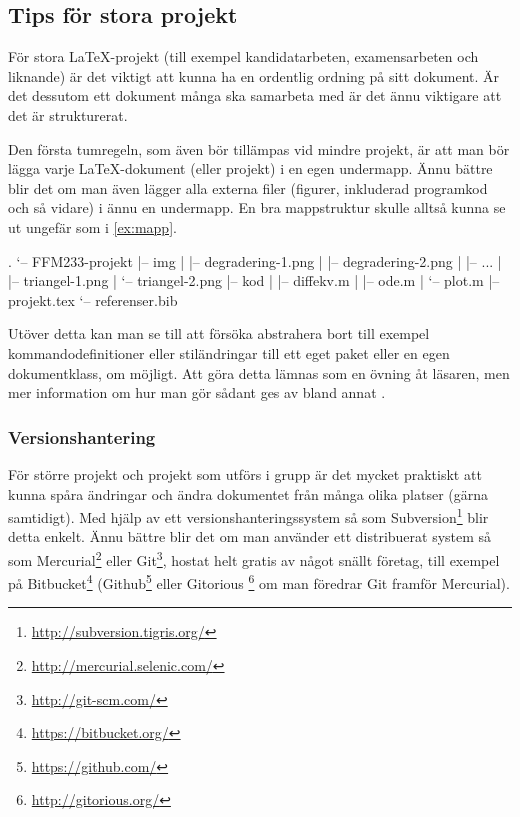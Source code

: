 \documentclass[lang=sv,ptsize=10pt,font=none,nomath,titles=bf,../../a4.tex]{subfiles}
\begin{document}
\subsection{Tips för stora projekt}
För stora \LaTeX-projekt (till exempel kandidatarbeten, examensarbeten
och liknande) är det viktigt att kunna ha en ordentlig ordning på sitt
dokument. Är det dessutom ett dokument många ska samarbeta med är det
ännu viktigare att det är strukturerat.

Den första tumregeln, som även bör tillämpas vid mindre projekt, är att
man bör lägga varje \LaTeX-dokument (eller projekt) i en egen undermapp.
Ännu bättre blir det om man även lägger alla externa filer (figurer,
inkluderad programkod och så vidare) i ännu en undermapp. En bra
mappstruktur skulle alltså kunna se ut ungefär som i \cref{ex:mapp}.

\begin{kod}
	\begin{textcode}
.
`-- FFM233-projekt
|-- img
|   |-- degradering-1.png
|   |-- degradering-2.png
|   |-- ...
|   |-- triangel-1.png
|   `-- triangel-2.png
|-- kod
|   |-- diffekv.m
|   |-- ode.m
|   `-- plot.m
|-- projekt.tex
`-- referenser.bib
	\end{textcode}
	\caption{En bra mappstruktur för ett enkelt \LaTeX-projekt.}
	\label{ex:mapp}
\end{kod}

Utöver detta kan man se till att försöka abstrahera bort till exempel
kommandodefinitioner eller stiländringar till ett eget paket eller en
egen dokumentklass, om möjligt. Att göra detta lämnas som en övning åt
läsaren, men mer information om hur man gör sådant ges av bland annat
\textcites{Flynn06}{LaTeX3}{Robertson06}.

\subsubsection{Versionshantering}
För större projekt och projekt som utförs i grupp är det mycket praktiskt
att kunna spåra ändringar och ändra dokumentet från många olika platser
(gärna samtidigt). Med hjälp av ett versionshanteringssystem så som 
Subversion\footnote{\url{http://subversion.tigris.org/}} blir detta
enkelt. Ännu bättre blir det om man använder ett distribuerat system så
som Mercurial\footnote{\url{http://mercurial.selenic.com/}} eller
Git\footnote{\url{http://git-scm.com/}}, hostat helt gratis av något snällt
företag, till exempel på Bitbucket\footnote{\url{https://bitbucket.org/}}
(Github\footnote{\url{https://github.com/}} eller Gitorious%
\footnote{\url{http://gitorious.org/}} om man föredrar Git framför Mercurial).
\end{document}
